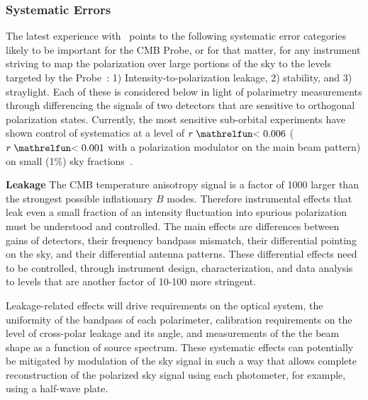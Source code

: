 
\subsubsection{Systematic Errors}
\vspace{-0.05in}

The latest experience with \planck\ points to the following systematic error categories likely to be important 
for the CMB Probe, or for that matter, for any instrument striving to map the polarization 
over large portions of the sky to the levels targeted by the Probe~\cite{planck2016_xlvi}:
1) Intensity-to-polarization leakage, 2) stability, and 3) straylight. 
Each of these is considered below in light of polarimetry measurements through
differencing the signals of two detectors that are sensitive to orthogonal polarization states. 
Currently, the most sensitive sub-orbital 
experiments have shown control of systematics at a level of $r\simlt0.006$ ($r\simlt0.001$ with 
a polarization modulator on the main beam pattern) on small (1\%) sky fractions~\cite{bicep_systematics,abs2016_hwp}.


\textbf{Leakage}  The CMB temperature anisotropy signal is a factor of 1000 larger 
than the strongest possible inflationary $B$ modes. Therefore instrumental effects that leak
even a small fraction of an intensity fluctuation into spurious polarization must be understood 
and controlled. The main effects are differences between gains of detectors, 
their frequency bandpass mismatch, their differential pointing on the sky, 
and their differential antenna patterns. 
These differential effects need to be controlled, through 
instrument design, characterization, and data analysis to levels that are another 
factor of 10-100 more stringent. 

Leakage-related effects will drive requirements on the optical system, the uniformity of the
bandpass of each polarimeter, calibration requirements on the level of cross-polar leakage and its angle,
and measurements of the the beam shape as a function of source spectrum. 
These systematic effects can potentially be mitigated by modulation of the sky signal in
such a way that allows complete reconstruction of the 
polarized sky signal using each photometer, for example, using a
half-wave plate.  

